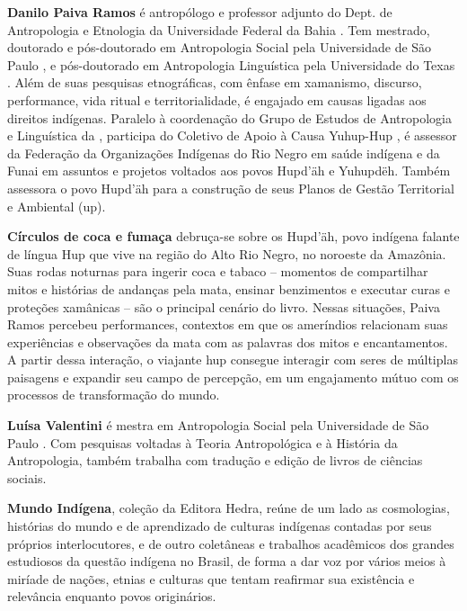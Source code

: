 \textbf{Danilo Paiva Ramos} é antropólogo e professor adjunto do Dept. de Antropologia e Etnologia da Universidade Federal da Bahia . Tem mestrado, doutorado e pós-doutorado em Antropologia Social pela Universidade de São Paulo , e pós-doutorado em Antropologia Linguística pela Universidade do Texas . Além de suas pesquisas etnográficas, com ênfase em xamanismo, discurso, performance, vida ritual e territorialidade, é engajado em causas ligadas aos direitos indígenas. Paralelo à coordenação do Grupo de Estudos de Antropologia e Linguística  da , participa do Coletivo de Apoio à Causa Yuhup-Hup , é assessor da Federação da Organizações Indígenas do Rio Negro  em saúde indígena e da Funai em assuntos e projetos voltados aos povos Hupd'äh e Yuhupdëh. Também assessora o povo Hupd'äh para a construção de seus Planos de Gestão Territorial e Ambiental (up).


\textbf{Círculos de coca e fumaça} debruça-se sobre os Hupd’äh, povo indígena falante de língua Hup que vive na região do Alto Rio Negro, no noroeste da Amazônia. Suas rodas noturnas para ingerir coca e tabaco -- momentos de compartilhar mitos e histórias de andanças pela mata, ensinar benzimentos e executar curas e proteções xamânicas -- são o principal cenário do livro. Nessas situações, Paiva Ramos percebeu performances, contextos em que os ameríndios relacionam suas experiências e observações da mata com as palavras dos mitos e encantamentos. A partir dessa interação, o viajante hup consegue interagir com seres de múltiplas paisagens e expandir seu campo de percepção, em um engajamento mútuo com os processos de transformação do mundo.


\textbf{Luísa Valentini} é mestra em Antropologia Social pela Universidade de São Paulo . Com pesquisas voltadas à Teoria Antropológica e à História da Antropologia, também trabalha com tradução e edição de livros de ciências sociais.


\textbf{Mundo Indígena}, coleção da Editora Hedra, reúne de um lado as cosmologias, histórias do mundo e de aprendizado de culturas indígenas contadas por seus próprios interlocutores, e de outro coletâneas e trabalhos acadêmicos dos grandes estudiosos da questão indígena no Brasil, de forma a dar voz por vários meios à miríade de nações, etnias e culturas que tentam reafirmar sua existência e relevância enquanto povos originários.\par